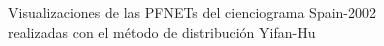 \documentclass[10pt,a4paper,spanish]{article}
\numberwithin{equation}{section} %
\numberwithin{figure}{section} %
\numberwithin{table}{section} %
\begin{document}
\begin{figure}[!h]
{{            \label{q4yfsp}
        }
    }
    \caption{Visualizaciones de las PFNETs del cienciograma Spain-2002 realizadas con el método de distribución Yifan-Hu}
    \label{yfsp}
\end{figure}
\end{document}
